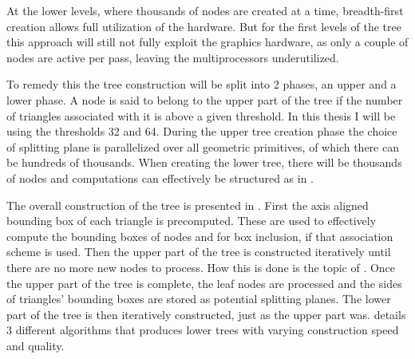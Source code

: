 
At the lower levels, where thousands of nodes are created at a time,
breadth-first creation allows full utilization of the hardware. But
for the first levels of the tree this approach will still not fully
exploit the graphics hardware, as only a couple of nodes are active
per pass, leaving the multiprocessors underutilized.

To remedy this the tree construction will be split into 2 phases, an
upper and a lower phase. A node is said to belong to the upper part of
the tree if the number of triangles associated with it is above a
given threshold. In this thesis I will be using the thresholds 32 and
64. During the upper tree creation phase the choice of splitting plane
is parallelized over all geometric primitives, of which there can be
hundreds of thousands. When creating the lower tree, there will be
thousands of nodes and computations can effectively be structured as
in .


The overall construction of the tree is presented in
. First the axis aligned bounding box of
each triangle is precomputed. These are used to effectively compute
the bounding boxes of nodes and for box inclusion, if that association
scheme is used. Then the upper part of the tree is constructed
iteratively until there are no more new nodes to process. How this is
done is the topic of . Once the upper part
of the tree is complete, the leaf nodes are processed and the sides of
triangles' bounding boxes are stored as potential splitting
planes. The lower part of the tree is then iteratively constructed,
just as the upper part was.  details 3
different algorithms that produces lower trees with varying
construction speed and quality.

